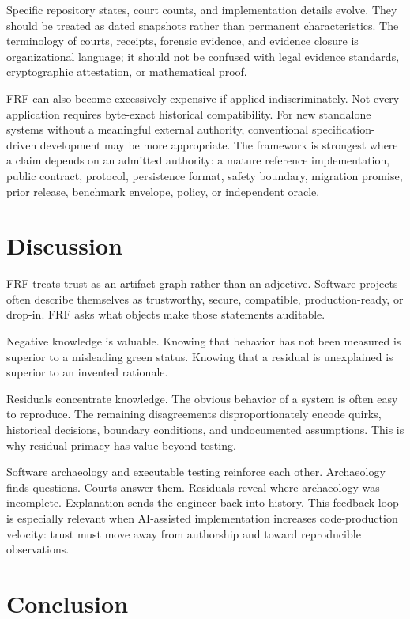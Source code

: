 \documentclass[11pt,a4paper]{article}
\newcommand{\frf}{\textsc{FRF}}
\begin{document}
Specific repository states, court counts, and implementation details evolve. They should be treated as dated snapshots rather than permanent characteristics. The terminology of courts, receipts, forensic evidence, and evidence closure is organizational language; it should not be confused with legal evidence standards, cryptographic attestation, or mathematical proof.

\frf{} can also become excessively expensive if applied indiscriminately. Not every application requires byte-exact historical compatibility. For new standalone systems without a meaningful external authority, conventional specification-driven development may be more appropriate. The framework is strongest where a claim depends on an admitted authority: a mature reference implementation, public contract, protocol, persistence format, safety boundary, migration promise, prior release, benchmark envelope, policy, or independent oracle.

\section{Discussion}

\frf{} treats trust as an artifact graph rather than an adjective. Software projects often describe themselves as trustworthy, secure, compatible, production-ready, or drop-in. \frf{} asks what objects make those statements auditable.

Negative knowledge is valuable. Knowing that behavior has not been measured is superior to a misleading green status. Knowing that a residual is unexplained is superior to an invented rationale.

Residuals concentrate knowledge. The obvious behavior of a system is often easy to reproduce. The remaining disagreements disproportionately encode quirks, historical decisions, boundary conditions, and undocumented assumptions. This is why residual primacy has value beyond testing.

Software archaeology and executable testing reinforce each other. Archaeology finds questions. Courts answer them. Residuals reveal where archaeology was incomplete. Explanation sends the engineer back into history. This feedback loop is especially relevant when AI-assisted implementation increases code-production velocity: trust must move away from authorship and toward reproducible observations.

\section{Conclusion}
\end{document}
